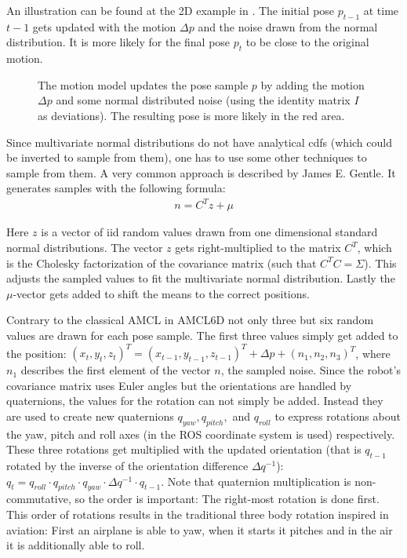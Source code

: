 \documentclass[Thesis.tex]{subfiles}
\begin{document}
An illustration can be found at the 2D example in . The initial pose $p_{t-1}$ at time $t-1$ gets updated with the motion $\Delta p$ and the noise drawn from the normal distribution. It is more likely for the final pose $p_t$ to be close to the original motion.
\begin{figure}[!htp]
  \caption{The motion model updates the pose sample $p$ by adding the motion $\Delta p$ and some normal distributed noise (using the identity matrix $I$ as deviations). The resulting pose is more likely in the red area.}
  \label{fig:2d_noise_sampling}
\end{figure}
%
Since multivariate normal distributions do not have analytical \gls{cdf}s (which could be inverted to sample from them), one has to use some other techniques to sample from them. A very common approach is described by James E. Gentle\cite[p.~197]{Gentle:2005}. It generates samples with the following formula:
%
\begin{align}
n = C^T z + \mu \label{form:mvndsampling}
\end{align}

Here $z$ is a vector of \gls{iid} random values drawn from one dimensional standard normal distributions. The vector $z$ gets right-multiplied to the matrix $C^T$, which is the Cholesky factorization of the covariance matrix (such that $C^TC = \Sigma$). This adjusts the sampled values to fit the multivariate normal distribution. Lastly the $\mu$-vector gets added to shift the means to the correct positions.

Contrary to the classical \gls{AMCL} in \gls{AMCL6D} not only three but six random values are drawn for each pose sample. The first three values simply get added to the position: $(x_t, y_t, z_t)^T = (x_{t-1}, y_{t-1}, z_{t-1})^T + \Delta p + (n_1, n_2, n_3)^T$, where $n_1$ describes the first element of the vector $n$, the sampled noise.
Since the robot's covariance matrix uses Euler angles but the orientations are handled by quaternions, the values for the rotation can not simply be added. Instead they are used to create new quaternions $q_{yaw}, q_{pitch},$ and $q_{roll}$ to express rotations about the yaw, pitch and roll axes (in  the \gls{ROS} coordinate system is used) respectively. These three rotations get multiplied with the updated orientation (that is $q_{t-1}$ rotated by the inverse of the orientation difference $\Delta q^{-1}$): $q_{t} = q_{roll} \cdot q_{pitch} \cdot q_{yaw} \cdot \Delta q^{-1} \cdot q_{t-1}$. Note that quaternion multiplication is non-commutative, so the order is important: The right-most rotation is done first. This order of rotations results in the traditional three body rotation inspired in aviation: First an airplane is able to yaw, when it starts it pitches and in the air it is additionally able to roll.
\end{document}
